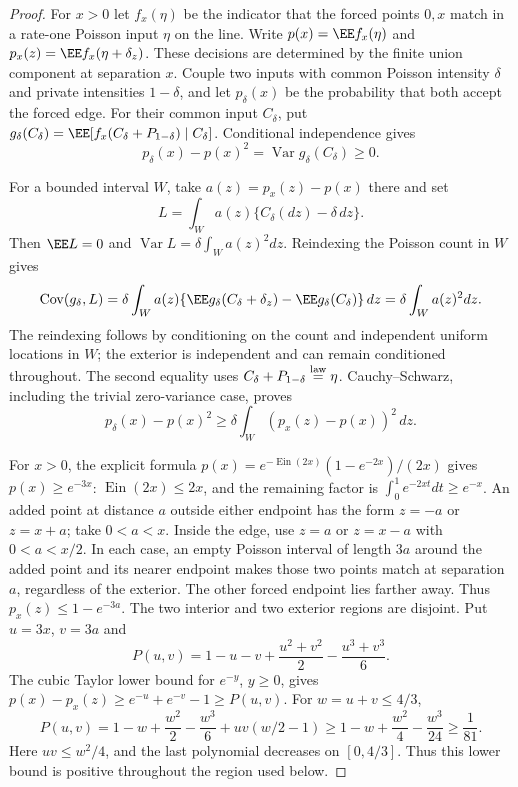 \documentclass[11pt,letterpaper]{article}
\begin{document}
\begin{proof}
For $x>0$ let $f_x(\eta)$ be the indicator that the forced points
$0,x$ match in a rate-one Poisson input $\eta$ on the line.
Write $p(x)=\EE f_x(\eta)$ and
$p_x(z)=\EE f_x(\eta+\delta_z)$. These decisions are determined
by the finite union component at separation $x$.
Couple two inputs with common Poisson intensity $\delta$ and
private intensities $1-\delta$, and let $p_\delta(x)$ be the
probability that both accept the forced edge.
For their common input $C_\delta$, put
$g_\delta(C_\delta)=\EE[f_x(C_\delta+P_{1-\delta})\mid C_\delta]$.
Conditional independence gives
\[
 p_\delta(x)-p(x)^2=\operatorname{Var}g_\delta(C_\delta)\ge0.
\]

For a bounded interval $W$, take
$a(z)=p_x(z)-p(x)$ there and set
\[
 L=\int_W a(z)\{C_\delta(dz)-\delta\,dz\}.
\]
Then $\EE L=0$ and $\operatorname{Var}L=\delta\int_W a(z)^2dz$.
Reindexing the Poisson count in $W$ gives
\[
 \operatorname{Cov}(g_\delta,L)
   =\delta\int_W a(z)
         \{\EE g_\delta(C_\delta+\delta_z)-\EE g_\delta(C_\delta)\}\,dz
   =\delta\int_W a(z)^2dz.
\]
The reindexing follows by conditioning on the count and independent
uniform locations in $W$; the exterior is independent and can
remain conditioned throughout. The second equality uses
$C_\delta+P_{1-\delta}\stackrel{\rm law}=\eta$.
Cauchy--Schwarz, including the trivial zero-variance case, proves
\begin{equation}\label{eq:forced-edge-linear-projection}
 p_\delta(x)-p(x)^2
       \ge\delta\int_W(p_x(z)-p(x))^2\,dz.
\end{equation}

For $x>0$, the explicit formula
$p(x)=e^{-\operatorname{Ein}(2x)}(1-e^{-2x})/(2x)$ gives
$p(x)\ge e^{-3x}$:
$\operatorname{Ein}(2x)\le2x$, and the remaining factor is
$\int_0^1e^{-2xt}dt\ge e^{-x}$.
An added point at distance $a$ outside either endpoint has
the form $z=-a$ or $z=x+a$; take $0<a<x$.
Inside the edge, use $z=a$ or $z=x-a$ with $0<a<x/2$.
In each case, an empty Poisson interval of length $3a$
around the added point and its nearer endpoint makes those
two points match at separation $a$, regardless of the exterior.
The other forced endpoint lies farther away.
Thus $p_x(z)\le1-e^{-3a}$.
The two interior and two exterior regions are disjoint.
Put $u=3x$, $v=3a$ and
\[
 P(u,v)=1-u-v+\frac{u^2+v^2}{2}-\frac{u^3+v^3}{6}.
\]
The cubic Taylor lower bound for $e^{-y}$, $y\ge0$, gives
$p(x)-p_x(z)\ge e^{-u}+e^{-v}-1\ge P(u,v)$.
For $w=u+v\le4/3$,
\[
 P(u,v)=1-w+\frac{w^2}{2}-\frac{w^3}{6}
                              +uv(w/2-1)
       \ge 1-w+\frac{w^2}{4}-\frac{w^3}{24}\ge\frac1{81}.
\]
Here $uv\le w^2/4$, and the last polynomial decreases
on $[0,4/3]$. Thus this lower bound is positive throughout
the region used below.


\end{proof}
\end{document}
